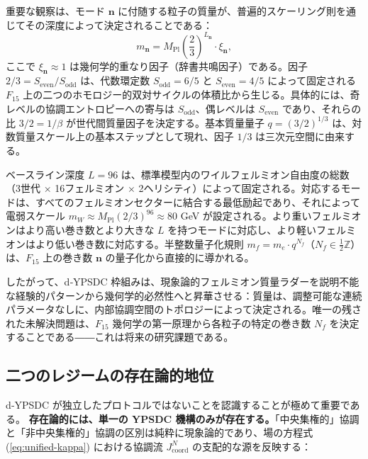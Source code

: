 \documentclass[12pt,a4paper]{article}
\begin{document}
	重要な観察は、モード \(\mathbf{n}\) に付随する粒子の質量が、普遍的スケーリング則を通じてその深度によって決定されることである：
	\begin{equation}
		m_{\mathbf{n}} = M_{\mathrm{Pl}} \left( \frac{2}{3} \right)^{L_{\mathbf{n}}} \cdot \xi_{\mathbf{n}},
		\label{eq:mass-L}
	\end{equation}
	ここで \(\xi_{\mathbf{n}} \approx 1\) は幾何学的重なり因子（辞書共鳴因子）である。因子 \(2/3 = S_{\mathrm{even}}/S_{\mathrm{odd}}\) は、代数環定数 \(S_{\mathrm{odd}}=6/5\) と \(S_{\mathrm{even}}=4/5\) によって固定される \(F_{15}\) 上の二つのホモロジー的双対サイクルの体積比から生じる。具体的には、奇レベルの協調エントロピーへの寄与は \(S_{\mathrm{odd}}\)、偶レベルは \(S_{\mathrm{even}}\) であり、それらの比 \(3/2 = 1/\beta\) が世代間質量因子を決定する。基本質量量子 \(q = (3/2)^{1/3}\) は、対数質量スケール上の基本ステップとして現れ、因子 \(1/3\) は三次元空間に由来する。
	
	ベースライン深度 \(L=96\) は、標準模型内のワイルフェルミオン自由度の総数（3世代 × 16フェルミオン × 2ヘリシティ）によって固定される。対応するモードは、すべてのフェルミオンセクターに結合する最低励起であり、それによって電弱スケール \(m_W \approx M_{\mathrm{Pl}} (2/3)^{96} \approx 80\) GeV が設定される。より重いフェルミオンはより高い巻き数とより大きな \(L\) を持つモードに対応し、より軽いフェルミオンはより低い巻き数に対応する。半整数量子化規則 \(m_f = m_e \cdot q^{N_f}\)（\(N_f \in \frac{1}{2}\mathbb{Z}\)）は、\(F_{15}\) 上の巻き数 \(\mathbf{n}\) の量子化から直接的に導かれる。
	
	したがって、d‑YPSDC 枠組みは、現象論的フェルミオン質量ラダーを説明不能な経験的パターンから幾何学的必然性へと昇華させる：質量は、調整可能な連続パラメータなしに、内部協調空間のトポロジーによって決定される。唯一の残された未解決問題は、\(F_{15}\) 幾何学の第一原理から各粒子の特定の巻き数 \(N_f\) を決定することである――これは将来の研究課題である。
	
	\subsection{二つのレジームの存在論的地位}
	\label{subsec:ontological-status}
	
	d‑YPSDC が独立したプロトコルではないことを認識することが極めて重要である。
	\textbf{存在論的には、単一の YPSDC 機構のみが存在する。}「中央集権的」協調と「非中央集権的」協調の区別は純粋に現象論的であり、場の方程式 (\ref{eq:unified-kappa}) における協調流 \(J^{N}_{\mathrm{coord}}\) の支配的な源を反映する：
	
\end{document}
